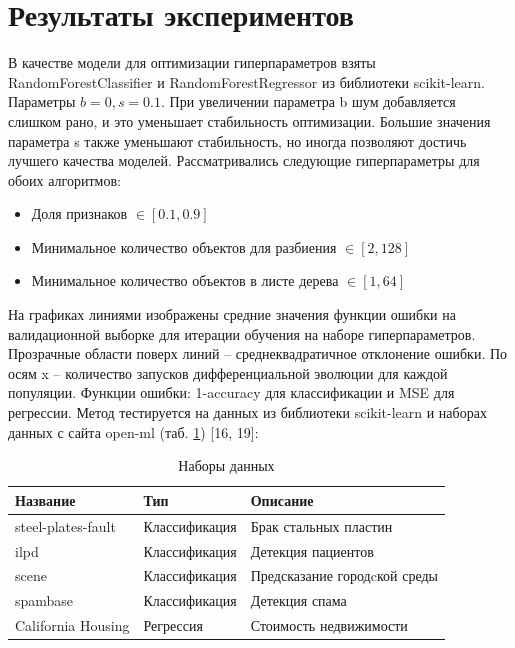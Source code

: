 \documentclass[a4paper,12pt]{article}
\begin{document}
\section{Результаты экспериментов}
В качестве модели для оптимизации гиперпараметров взяты RandomForestClassifier и RandomForestRegressor из библиотеки scikit-learn. Параметры  $b=0,s=0.1$. При увеличении параметра b шум добавляется слишком рано, и это уменьшает стабильность оптимизации. Большие значения параметра s также уменьшают стабильность, но иногда позволяют достичь лучшего качества моделей. Рассматривались следующие гиперпараметры для обоих алгоритмов:
\begin{itemize}
\item Доля признаков $\in [0.1, 0.9]$
\item Минимальное количество объектов для разбиения $\in [2, 128]$
\item Минимальное количество объектов в листе дерева $\in [1, 64]$
\end{itemize}

На графиках линиями изображены средние значения функции ошибки на валидационной выборке для итерации обучения на наборе гиперпараметров. Прозрачные области поверх линий – среднеквадратичное отклонение ошибки. По осям x – количество запусков дифференциальной эволюции для каждой популяции. Функции ошибки: 1-accuracy для классификации и MSE для регрессии.
Метод тестируется на данных из библиотеки scikit-learn  и наборах данных с сайта open-ml (таб. \ref{tab:dehb_datasets}) [16, 19]:
\begin{table}[H]
\centering
\begin{tabular}{|l|l|l|}
\hline
Название           & Тип           & Описание                     \\ \hline
steel-plates-fault & Классификация & Брак стальных пластин        \\ \hline
ilpd               & Классификация & Детекция пациентов           \\ \hline
scene              & Классификация & Предсказание городcкой среды \\ \hline
spambase           & Классификация & Детекция спама               \\ \hline
California Housing & Регрессия     & Стоимость недвижимости       \\ \hline
\end{tabular}
\caption{Наборы данных}
\label{tab:dehb_datasets}
\end{table}

\newpage
 
\end{document}
